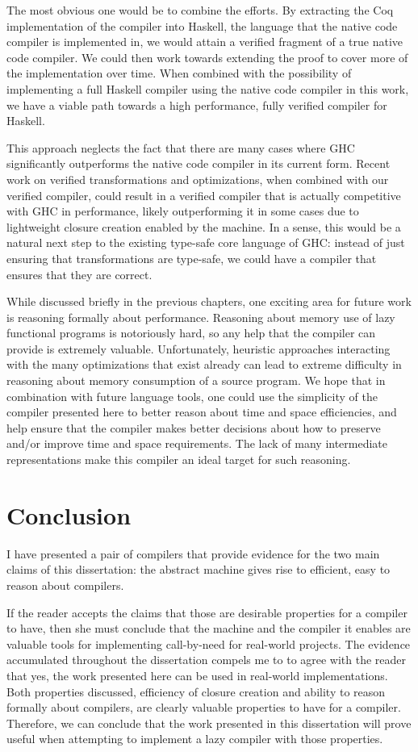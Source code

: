 The most obvious one would be to combine the efforts. By extracting the Coq
implementation of the compiler into Haskell, the language that the native code
compiler is implemented in, we would attain a verified fragment of a true native
code compiler. We could then work towards extending the proof to cover more of
the implementation over time. When combined with the possibility of implementing
a full Haskell compiler using the native code compiler in this work, we have a
viable path towards a high performance, fully verified compiler for Haskell. 

This approach neglects the fact that there are many cases where GHC
significantly outperforms the native code compiler in its current form. Recent
work on verified transformations and optimizations, when combined with our
verified compiler, could result in a verified compiler that is actually
competitive with GHC in performance, likely outperforming it in some cases due
to lightweight closure creation enabled by the \ce machine. In a sense, this
would be a natural next step to the existing type-safe core language of GHC:
instead of just ensuring that transformations are type-safe, we could have a
compiler that ensures that they are correct.

While discussed briefly in the previous chapters, one exciting area for future
work is reasoning formally about performance. Reasoning about memory use of lazy
functional programs is notoriously hard, so any help that the compiler can
provide is extremely valuable. Unfortunately, heuristic approaches interacting
with the many optimizations that exist already can lead to extreme difficulty in
reasoning about memory consumption of a source program. We hope that in
combination with future language tools, one could use the simplicity of the
compiler presented here to better reason about time and space efficiencies, and
help ensure that the compiler makes better decisions about how to preserve
and/or improve time and space requirements. The lack of many intermediate
representations make this compiler an ideal target for such reasoning.

\section{Conclusion}

I have presented a pair of compilers that provide evidence for the two main
claims of this dissertation: the \ce abstract machine gives rise to efficient,
easy to reason about compilers. 

If the reader accepts the claims that those are desirable properties for a
compiler to have, then she must conclude that the \ce machine and the compiler
it enables are valuable tools for implementing call-by-need for real-world
projects. The evidence accumulated throughout the dissertation compels me to
to agree with the reader that yes, the work presented here can be used in
real-world implementations. Both properties discussed, efficiency of closure
creation and ability to reason formally about compilers, are clearly valuable
properties to have for a compiler. Therefore, we can conclude that the work
presented in this dissertation will prove useful when attempting to implement a
lazy compiler with those properties. 


